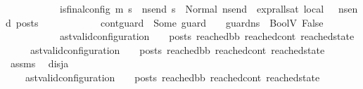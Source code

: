 \begin{isabellebody}
\ \ \ \ \ \ \ \ \ \ \ is{\isacharunderscore}{\kern0pt}final{\isacharunderscore}{\kern0pt}config\ {\isacharparenleft}{\kern0pt}m{\isacharprime}{\kern0pt}{\isacharcomma}{\kern0pt}\ s{\isacharprime}{\kern0pt}{\isacharparenright}{\kern0pt}\ {\isasymLongrightarrow}\ {\isasymforall}ns{\isacharunderscore}{\kern0pt}end{\isachardot}{\kern0pt}\ s{\isacharprime}{\kern0pt}\ {\isacharequal}{\kern0pt}\ Normal\ ns{\isacharunderscore}{\kern0pt}end\ {\isasymlongrightarrow}\ {\isacharparenleft}{\kern0pt}expr{\isacharunderscore}{\kern0pt}all{\isacharunderscore}{\kern0pt}sat\ {\isasymLambda}{}{\isacharunderscore}{\kern0pt}local\ {\isasymGamma}\ {\isasymOmega}\ ns{\isacharunderscore}{\kern0pt}end{\isacharparenright}{\kern0pt}\ posts{\isacharparenright}{\kern0pt}\ {\isasymLongrightarrow}\isanewline
\ \ \ \ \ \ \ \ \ \ \ {\isacharparenleft}{\kern0pt}{\isacharparenleft}{\kern0pt}cont{\isacharunderscore}{\kern0pt}guard\ {\isacharequal}{\kern0pt}\ Some\ guard{\isacharparenright}{\kern0pt}\ {\isasymLongrightarrow}\ {\isacharparenleft}{\kern0pt}{\isasymLambda}{\isacharcomma}{\kern0pt}{\isasymGamma}{\isacharcomma}{\kern0pt}{\isasymOmega}\ {\isasymturnstile}\ {\isasymlangle}guard{\isacharcomma}{\kern0pt}ns{}{\isacharprime}{\kern0pt}{\isacharprime}{\kern0pt}{\isasymrangle}\ {\isasymDown}\ BoolV\ False{\isacharparenright}{\kern0pt}{\isacharparenright}{\kern0pt}\ {\isasymLongrightarrow}\ \isanewline
\ \ \ \ \ \ \ \ \ \ \ ast{\isacharunderscore}{\kern0pt}valid{\isacharunderscore}{\kern0pt}configuration\ {\isasymLambda}\ {\isasymGamma}\ {\isasymOmega}\ posts\ reached{\isacharunderscore}{\kern0pt}bb\ reached{\isacharunderscore}{\kern0pt}cont\ reached{\isacharunderscore}{\kern0pt}state{\isachardoublequoteclose}\isanewline
\ \ \ \ \ {\isachardoublequoteopen}ast{\isacharunderscore}{\kern0pt}valid{\isacharunderscore}{\kern0pt}configuration\ {\isasymLambda}\ {\isasymGamma}\ {\isasymOmega}\ posts\ reached{\isacharunderscore}{\kern0pt}bb\ reached{\isacharunderscore}{\kern0pt}cont\ reached{\isacharunderscore}{\kern0pt}state{\isachardoublequoteclose}\isanewline
%
\isadelimproof
%
\endisadelimproof
%
\isatagproof
{}\isamarkupfalse%
\ {\isacharminus}{\kern0pt}\isanewline
\ \ \isamarkupfalse%
\ assms{\isacharparenleft}{\kern0pt}{}{\isacharminus}{\kern0pt}{}{\isacharparenright}{\kern0pt}\ \isamarkupfalse%
\ disj{\isacharunderscore}{\kern0pt}a{\isacharcolon}{\kern0pt}\isanewline
\ \ \ \ {\isachardoublequoteopen}{\isacharparenleft}{\kern0pt}ast{\isacharunderscore}{\kern0pt}valid{\isacharunderscore}{\kern0pt}configuration\ {\isasymLambda}\ {\isasymGamma}\ {\isasymOmega}\ posts\ reached{\isacharunderscore}{\kern0pt}bb\ reached{\isacharunderscore}{\kern0pt}cont\ reached{\isacharunderscore}{\kern0pt}state{\isacharparenright}{\kern0pt}\ {\isasymor}\ \isanewline

\end{isabellebody}
